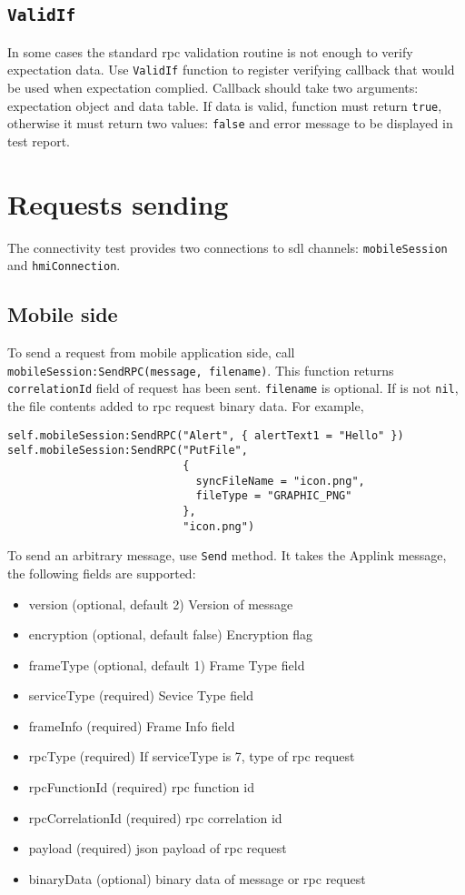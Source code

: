 \documentclass{article}
\begin{document}
\subsection{\tt ValidIf}
In some cases the standard {\sc rpc} validation routine is not enough to verify
expectation data.
Use {\tt ValidIf} function to register verifying callback that would be used
when expectation complied.
Callback should take two arguments: expectation object and data table.
If data is valid, function must return {\tt true}, otherwise it must return
two values: {\tt false} and error message to be displayed in test report.
\section{Requests sending}
The connectivity test provides two connections to {\sc sdl} channels:
{\tt mobileSession} and {\tt hmiConnection}.

\subsection{Mobile side}
To send a request from mobile application side, call
{\tt mobileSession:SendRPC(message, filename)}.
This function returns {\tt correlationId} field of request has been sent.
{\tt filename} is optional.
If is not {\tt nil}, the file contents added to {\sc rpc} request binary data.
For example,
\begin{lstlisting}
self.mobileSession:SendRPC("Alert", { alertText1 = "Hello" })
self.mobileSession:SendRPC("PutFile",
                           {
                             syncFileName = "icon.png",
                             fileType = "GRAPHIC_PNG"
                           },
                           "icon.png")
\end{lstlisting}

To send an arbitrary message, use {\tt Send} method.
It takes the Applink message, the following fields are supported:
\begin{itemize}
\item version (optional, default 2) Version of message
\item encryption (optional, default false) Encryption flag
\item frameType (optional, default 1) Frame Type field
\item serviceType (required) Sevice Type field
\item frameInfo (required) Frame Info field
\item rpcType (required) If serviceType is 7, type of {\sc rpc} request
\item rpcFunctionId (required) {\sc rpc} function id
\item rpcCorrelationId (required) {\sc rpc} correlation id
\item payload (required) {\sc json} payload of {\sc rpc} request
\item binaryData (optional) binary data of message or {\sc rpc} request
\end{itemize}
\end{document}
